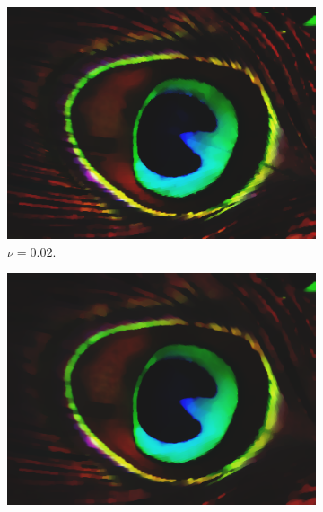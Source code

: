 \documentclass[abstracton]{scrreprt}
\begin{document}
\begin{figure}[!ht]
                \begin{subfigure}[b]{0.24\textwidth}
                    \includegraphics[width=\textwidth]{img/segmentation/cr/002peacock-feather.png}
                    \caption{$\nu = 0.02$.}
                \end{subfigure}
                \begin{subfigure}[b]{0.24\textwidth}
                    \includegraphics[width=\textwidth]{img/segmentation/cr/003peacock-feather.png}

\end{subfigure}
\end{figure}
\end{document}
